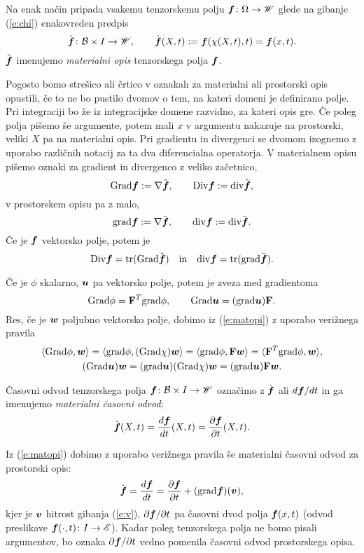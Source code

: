Na enak način pripada vsakemu tenzorskemu polju $\boldsymbol f\colon\Omega\to\mathscr W$
glede na gibanje (\ref{e:chi}) enakovreden predpis
\begin{equation} \label{e:matopi}
	\hat{\boldsymbol f}\colon \mathcal B\times I\to\mathscr W,\qquad
	\hat{\boldsymbol f}(X,t):=\boldsymbol f(\chi(X,t),t)=\boldsymbol f(x,t).
\end{equation}
$\hat{\boldsymbol f}$ imenujemo \emph{materialni opis} tenzorskega polja $\boldsymbol f$.

Pogosto bomo strešico ali črtico v oznakah za materialni ali prostorski opis opustili,
če to ne bo pustilo dvomov o tem, na kateri domeni je definirano polje.
Pri integraciji bo že iz integracijske domene razvidno, za kateri opis gre.
Če poleg polja pišemo še argumente, potem mali $x$ v argumentu nakazuje na prostorski,
veliki $X$ pa na materialni opis.
Pri gradientu in divergenci se dvomom izognemo z uporabo različnih notacij
za ta dva diferencialna operatorja.
V materialnem opisu pišemo oznaki za gradient in divergenco z veliko začetnico,
\[ \mathrm{Grad}\boldsymbol f:=\nabla\hat{\boldsymbol f},\qquad \mathrm {Div}\boldsymbol f:=\mathrm{div}\hat{\boldsymbol f}, \]
v prostorskem opisu pa z malo,
\[ \mathrm{grad}\boldsymbol f:=\nabla\bar{\boldsymbol f},\qquad \mathrm{div}\boldsymbol f:=\mathrm{div}\bar{\boldsymbol f}. \]
Če je $\boldsymbol f$ vektorsko polje, potem je
\[
	\mathrm {Div}\boldsymbol f=\mathrm{tr}(\mathrm{Grad}\hat{\boldsymbol f})\quad\textrm{in}\quad
	\mathrm{div}\boldsymbol f=\mathrm{tr}(\mathrm{grad}\bar{\boldsymbol f}).
\]

Če je $\phi$ skalarno, $\boldsymbol u$ pa vektorsko polje, potem je zveza med gradientoma
\begin{equation}\label{e:gz}
	\mathrm{Grad}\phi=\mathbf F^{T}\mathrm{grad}\phi,\qquad \mathrm{Grad}\boldsymbol u=(\mathrm{grad}\boldsymbol u)\mathbf F.
\end{equation}
Res, če je $\boldsymbol w$ poljubno vektorsko polje, dobimo iz (\ref{e:matopi})
z uporabo verižnega pravila
\begin{gather*}
	\langle\mathrm{Grad}\phi,\boldsymbol w\rangle=\langle\mathrm{grad}\phi,(\mathrm{Grad}\chi)\boldsymbol w\rangle=
	\langle\mathrm{grad}\phi, \mathbf F\boldsymbol w\rangle=\langle\mathbf F^{T}\mathrm{grad}\phi,\boldsymbol w\rangle, \\
	(\mathrm{Grad}\boldsymbol u)\boldsymbol w=(\mathrm{grad}\boldsymbol u)(\mathrm{Grad}\chi)\boldsymbol w
	=(\mathrm{grad}\boldsymbol u)\mathbf F\boldsymbol w.
\end{gather*}

\begin{definicija}
	Časovni odvod tenzorskega polja $\boldsymbol f\colon \mathcal B\times I\to\mathscr W$ označimo z
	$\dot{\boldsymbol f}$ ali $d\boldsymbol f/dt$ in ga imenujemo \emph{materialni časovni odvod};
	\[ \dot{\boldsymbol f}(X,t)=\frac{d\boldsymbol f}{dt}(X,t)=\frac{\partial\boldsymbol f}{\partial t}(X,t). \]
\end{definicija}
Iz (\ref{e:matopi}) dobimo z uporabo verižnega pravila še materialni časovni odvod za prostorski opis:
\begin{equation} \label{e:matodv}
	\dot{\boldsymbol f}=\frac{d\boldsymbol f}{dt}=
	\frac{\partial\boldsymbol f}{\partial t}+(\mathrm{grad}\boldsymbol f)(\boldsymbol v),
\end{equation}
kjer je $\boldsymbol v$ hitrost gibanja (\ref{e:v}), $\partial\boldsymbol f/\partial t$ pa
časovni dvod polja $\boldsymbol f(x,t)$ (odvod preslikave $\boldsymbol f(\cdot,t)\colon I\to\mathscr E$).
Kadar poleg tenzorskega polja ne bomo pisali argumentov,
bo oznaka $\partial\boldsymbol f/\partial t$ vedno pomenila časovni odvod prostorskega opisa.

